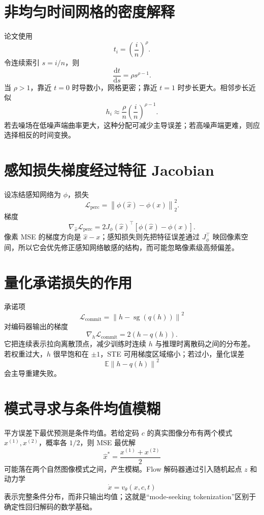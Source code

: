 \documentclass[UTF8,12pt,a4paper,fontset=none]{ctexart}
\numberwithin{equation}{section}
\newcommand{\E}{\mathbb{E}}
\newcommand{\Loss}{\mathcal{L}}
\newcommand{\norm}[1]{\left\lVert #1\right\rVert}
\newcommand{\sg}{\operatorname{sg}}
\newcommand{\dd}{\mathrm{d}}
\begin{document}
\section{非均匀时间网格的密度解释}
论文使用
\begin{equation}
 t_i=\left(\frac{i}{n}\right)^\rho.
\end{equation}
令连续索引 $s=i/n$，则
\begin{equation}
 \frac{\dd t}{\dd s}=\rho s^{\rho-1}.
\end{equation}
当 $\rho>1$，靠近 $t=0$ 时导数小，网格更密；靠近 $t=1$ 时步长更大。相邻步长近似
\begin{equation}
 h_i\approx\frac\rho n\left(\frac{i}{n}\right)^{\rho-1}.
\end{equation}
若去噪场在低噪声端曲率更大，这种分配可减少主导误差；若高噪声端更难，则应选择相反的时间变换。

\section{感知损失梯度经过特征 Jacobian}
设冻结感知网络为 $\phi$，损失
\begin{equation}
 \Loss_{\mathrm{perc}}
 =\norm{\phi(\widehat x)-\phi(x)}_2^2.
\end{equation}
梯度
\begin{equation}
 \nabla_{\widehat x}\Loss_{\mathrm{perc}}
 =2J_\phi(\widehat x)^\top[\phi(\widehat x)-\phi(x)].
\end{equation}
像素 MSE 的梯度方向是 $\widehat x-x$；感知损失则先把特征误差通过 $J_\phi^\top$ 映回像素空间，所以它会优先修正感知网络敏感的结构，而可能忽略像素级高频偏差。

\section{量化承诺损失的作用}
承诺项
\begin{equation}
 \Loss_{\mathrm{commit}}=\norm{h-\sg(q(h))}^2
\end{equation}
对编码器输出的梯度
\begin{equation}
 \nabla_h\Loss_{\mathrm{commit}}=2(h-q(h)).
\end{equation}
它把连续表示拉向离散顶点，减少训练时连续 $h$ 与推理时离散码之间的分布差。若权重过大，$h$ 很早饱和在 $\pm1$，STE 可用梯度区域缩小；若过小，量化误差
\begin{equation}
 \E\norm{h-q(h)}^2
\end{equation}
会主导重建失败。

\section{模式寻求与条件均值模糊}
平方误差下最优预测是条件均值。若给定码 $c$ 的真实图像分布有两个模式 $x^{(1)},x^{(2)}$，概率各 $1/2$，则 MSE 最优解
\begin{equation}
 \widehat x^*=\frac{x^{(1)}+x^{(2)}}2
\end{equation}
可能落在两个自然图像模式之间，产生模糊。Flow 解码器通过引入随机起点 $z$ 和动力学
\begin{equation}
 \dot x=v_\theta(x,c,t)
\end{equation}
表示完整条件分布，而非只输出均值；这就是“mode-seeking tokenization”区别于确定性回归解码的数学基础。
\clearpage
\end{document}
